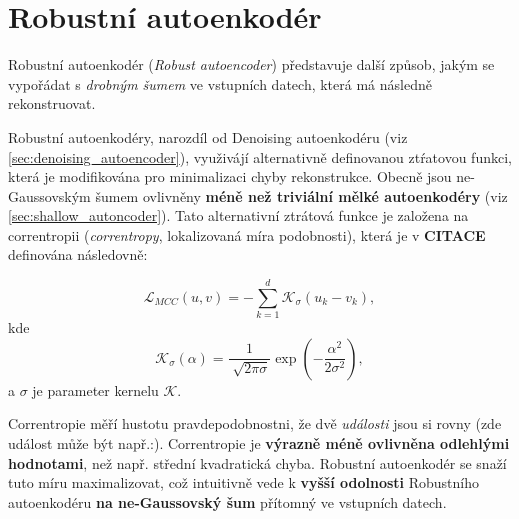 \section{Robustní autoenkodér}
Robustní autoenkodér (\emph{Robust autoencoder}) představuje další způsob, jakým se vypořádat s \emph{drobným šumem} ve vstupních datech, která má následně rekonstruovat.


Robustní autoenkodéry, narozdíl od Denoising autoenkodéru (viz \autoref{sec:denoising_autoencoder}), využivájí alternativně definovanou ztŕatovou funkci, která je modifikována pro minimalizaci chyby rekonstrukce.
Obecně jsou ne-Gaussovským šumem ovlivněny \textbf{méně než triviální mělké autoenkodéry} (viz \autoref{sec:shallow_autoncoder}).
Tato alternativní ztrátová funkce je založena na correntropii (\emph{correntropy}, lokalizovaná míra podobnosti), která je v \textbf{CITACE} definována následovně:

\begin{equation}
    \mathcal{L}_{MCC}(u, v) = -\sum_{k=1}^{d} \mathcal{K}_\sigma(u_k - v_k),
\end{equation}
kde
\begin{equation}
    \mathcal{K}_\sigma(\alpha) = \frac{1}{\sqrt[]{2\pi\sigma}}\exp(-\frac{\alpha^2}{2\sigma^2}),
\end{equation}
a $\sigma$ je parameter kernelu $\mathcal{K}$.

Correntropie měří hustotu pravdepodobnostni, že dvě \emph{události} jsou si rovny (zde událost může být např.:).
Correntropie je \textbf{výrazně méně ovlivněna odlehlými hodnotami}, než např. střední kvadratická chyba. \cite{Liu2006}
Robustní autoenkodér se snaží tuto míru maximalizovat, což intuitivně vede k \textbf{vyšší odolnosti} Robustního autoenkodéru \textbf{na ne-Gaussovský šum} přítomný ve vstupních datech.
